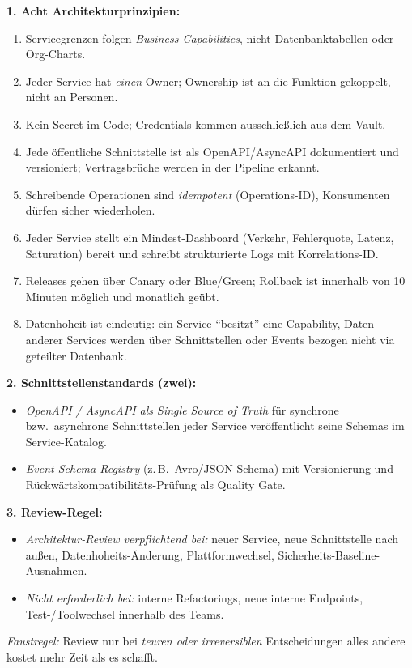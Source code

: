 \documentclass[11pt,a4paper,oneside]{article}
\begin{document}
\begin{loesungbox}
\textbf{1. Acht Architekturprinzipien:}
\begin{enumerate}
  \item Servicegrenzen folgen \emph{Business Capabilities}, nicht Datenbanktabellen oder Org-Charts.
  \item Jeder Service hat \emph{einen} Owner; Ownership ist an die Funktion gekoppelt, nicht an Personen.
  \item Kein Secret im Code; Credentials kommen ausschlie{\ss}lich aus dem Vault.
  \item Jede \"offentliche Schnittstelle ist als OpenAPI/AsyncAPI dokumentiert und versioniert; Vertragsbr\"uche werden in der Pipeline erkannt.
  \item Schreibende Operationen sind \emph{idempotent} (Operations-ID), Konsumenten d\"urfen sicher wiederholen.
  \item Jeder Service stellt ein Mindest-Dashboard (Verkehr, Fehlerquote, Latenz, Saturation) bereit und schreibt strukturierte Logs mit Korrelations-ID.
  \item Releases gehen \"uber Canary oder Blue/Green; Rollback ist innerhalb von 10 Minuten m\"oglich und monatlich ge\"ubt.
  \item Datenhoheit ist eindeutig: ein Service ``besitzt'' eine Capability, Daten anderer Services werden \"uber Schnittstellen oder Events bezogen \textendash{} nicht via geteilter Datenbank.
\end{enumerate}

\smallskip
\textbf{2. Schnittstellenstandards (zwei):}
\begin{itemize}
  \item \emph{OpenAPI / AsyncAPI als Single Source of Truth} f\"ur synchrone bzw.\ asynchrone Schnittstellen \textendash{} jeder Service ver\"offentlicht seine Schemas im Service-Katalog.
  \item \emph{Event-Schema-Registry} (z.\,B.\ Avro/JSON-Schema) mit Versionierung und R\"uckw\"artskompatibilit\"ats-Pr\"ufung als Quality Gate.
\end{itemize}

\smallskip
\textbf{3. Review-Regel:}
\begin{itemize}
  \item \emph{Architektur-Review verpflichtend bei:} neuer Service, neue Schnittstelle nach au{\ss}en, Datenhoheits-\"Anderung, Plattformwechsel, Sicherheits-Baseline-Ausnahmen.
  \item \emph{Nicht erforderlich bei:} interne Refactorings, neue interne Endpoints, Test-/Toolwechsel innerhalb des Teams.
\end{itemize}
\emph{Faustregel:} Review nur bei \emph{teuren oder irreversiblen} Entscheidungen \textendash{} alles andere kostet mehr Zeit als es schafft.


\end{loesungbox}
\end{document}
